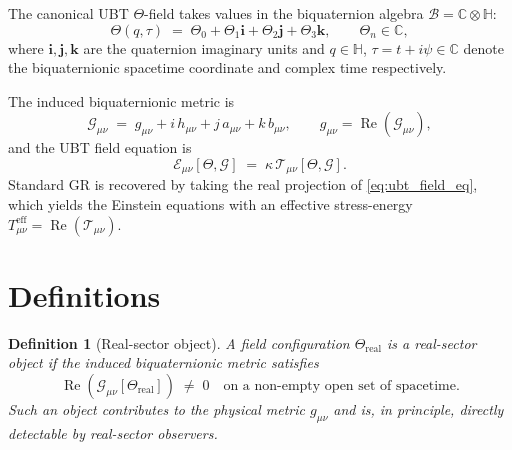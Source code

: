 \documentclass[12pt]{article}
\newtheorem{definition}{Definition}
\begin{document}
The canonical UBT $\Theta$-field takes values in the biquaternion
algebra $\mathcal{B} = \mathbb{C} \otimes \mathbb{H}$:
\begin{equation}
  \Theta(q,\tau) \;=\;
  \Theta_0 + \Theta_1 \mathbf{i} + \Theta_2 \mathbf{j} + \Theta_3 \mathbf{k},
  \qquad \Theta_n \in \mathbb{C},
  \label{eq:theta_field}
\end{equation}
where $\mathbf{i}, \mathbf{j}, \mathbf{k}$ are the quaternion
imaginary units and $q \in \mathbb{H}$, $\tau = t + i\psi \in
\mathbb{C}$ denote the biquaternionic spacetime coordinate and
complex time respectively.

The induced biquaternionic metric is
\begin{equation}
  \mathcal{G}_{\mu\nu}
  \;=\; g_{\mu\nu} + i\,h_{\mu\nu} + j\,a_{\mu\nu} + k\,b_{\mu\nu},
  \qquad g_{\mu\nu} = \operatorname{Re}(\mathcal{G}_{\mu\nu}),
  \label{eq:biquat_metric}
\end{equation}
and the UBT field equation is
\begin{equation}
  \mathcal{E}_{\mu\nu}[\Theta,\mathcal{G}]
  \;=\; \kappa\,\mathcal{T}_{\mu\nu}[\Theta,\mathcal{G}].
  \label{eq:ubt_field_eq}
\end{equation}
Standard GR is recovered by taking the real projection of
\eqref{eq:ubt_field_eq}, which yields the Einstein equations with
an effective stress-energy $T_{\mu\nu}^{\mathrm{eff}} =
\operatorname{Re}(\mathcal{T}_{\mu\nu})$.

\section{Definitions}

\begin{definition}[Real-sector object]
A field configuration $\Theta_\mathrm{real}$ is a
\emph{real-sector object} if the induced biquaternionic metric
satisfies
\begin{equation}
  \operatorname{Re}\!\left(\mathcal{G}_{\mu\nu}[\Theta_\mathrm{real}]\right)
  \;\neq\; 0
  \quad \text{on a non-empty open set of spacetime}.
\end{equation}
Such an object contributes to the physical metric $g_{\mu\nu}$
and is, in principle, directly detectable by real-sector observers.
\end{definition}
\end{document}
